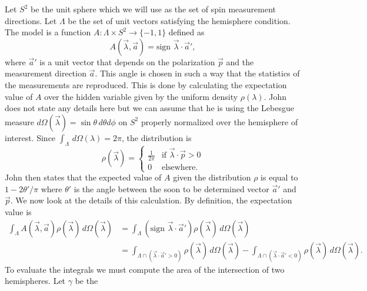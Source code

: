 \documentclass[a4paper]{article}
\begin{document}
    Let $S^2$ be the unit sphere which we will use as the
    set of spin measurement directions. Let $\Lambda$ be the
    set of unit vectors satisfying the hemisphere condition.
    The model is a function $A : \Lambda \times S^2 \to
    \{-1,1\}$ defined as
    \begin{equation}
        A(\vec \lambda, \vec a)
        = \text{sign } \vec \lambda \cdot \vec a',
    \end{equation}
    where $\vec a'$ is a unit vector that depends on the
    polarization $\vec p$ and the measurement direction
    $\vec a$. This angle is chosen in such a way that the
    statistics of the measurements are reproduced. This is
    done by calculating the expectation value of $A$ over
    the hidden variable given by the uniform density
    $\rho(\lambda)$. John does not state any details here
    but we can assume that he is using the Lebesgue measure
    $d\Omega(\vec \lambda) = \sin\theta \, d\theta d\phi$ on
    $S^2$ properly normalized over the hemisphere of
    interest. Since $\int_{\Lambda} \, d\Omega(\lambda) =
    2\pi$, the distribution is 
    \begin{equation}
        \rho(\vec \lambda)
        =
        \begin{cases}
            \frac{1}{2\pi} & \text{if } \vec \lambda \cdot
            \vec p > 0 \\
            0 & \text{elsewhere.}
        \end{cases}
    \end{equation}
    John then states that the expected value of $A$ given
    the distribution $\rho$ is equal to $1 - 2\theta' / \pi$ 
    where $\theta'$ is the angle between the soon to be
    determined vector $\vec a'$ and $\vec p$. We now look
    at the details of this calculation. By definition, the
    expectation value is
    \begin{align}
        \int_{\Lambda}
        A(\vec \lambda, \vec a) \rho(\vec \lambda) \,
        d\Omega(\vec \lambda)
        &= \int_{\Lambda}
        (\text{sign } \vec \lambda \cdot \vec a') \rho(\vec
        \lambda) \, d\Omega(\vec \lambda) \\
        &= \int_{\Lambda \cap (\vec \lambda \cdot \vec a' >
        0)} \rho(\vec \lambda) \, d\Omega(\vec \lambda)
        - \int_{\Lambda \cap (\vec \lambda \cdot \vec a' <
        0)} \rho(\vec \lambda) \, d\Omega(\vec \lambda).
    \end{align}
    To evaluate the integrals we must compute the area of
    the intersection of two hemispheres. Let $\gamma$ be the
\end{document}
